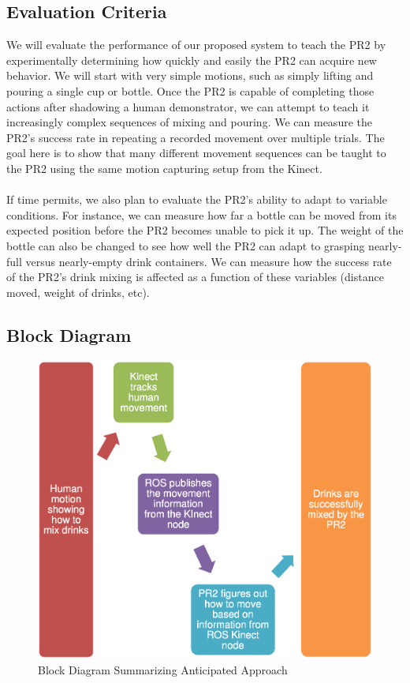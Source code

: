 \documentclass{sig-alternate}
\begin{document}
\subsection{Evaluation Criteria}
\label{subsec:eval_criteria}
We will evaluate the performance of our proposed system to teach the PR2 by experimentally determining how quickly and easily the PR2
can acquire new behavior. We will start with very simple motions, such as simply lifting and pouring a single cup or bottle. Once the PR2 is capable of completing those actions after shadowing a human demonstrator, we can attempt to teach it increasingly complex sequences of mixing and pouring. We can measure the PR2's success rate in repeating a recorded movement over multiple trials. The goal here is to show that many different movement sequences can be taught to the PR2 using the same motion capturing setup from the Kinect.\\
\\
If time permits, we also plan to evaluate the PR2's ability to adapt to variable conditions. For instance, we can measure how far a bottle can be moved from its expected position before the PR2 becomes unable to pick it up. The weight of the bottle can also be changed to see how well the PR2 can adapt to grasping nearly-full versus nearly-empty drink containers. We can measure how the success rate of the PR2's drink mixing is affected as a function of these variables (distance moved, weight of drinks, etc).
\subsection{Block Diagram}
\label{subsec:block_diagram}

\begin{figure}[h!] 
	\begin{center}
		\includegraphics[width=0.9\linewidth]{flowchart}
	\end{center}
	\caption{Block Diagram Summarizing Anticipated Approach}
	\label{fig:some_graph}
\end{figure}
\end{document}
